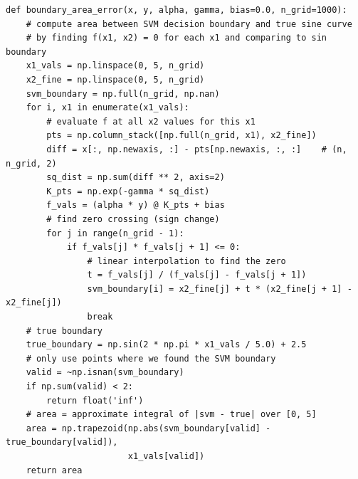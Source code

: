 \documentclass[11pt]{article}
\theoremstyle{mystyle}
\begin{document}
\begin{verbatim}
def boundary_area_error(x, y, alpha, gamma, bias=0.0, n_grid=1000):
    # compute area between SVM decision boundary and true sine curve
    # by finding f(x1, x2) = 0 for each x1 and comparing to sin boundary
    x1_vals = np.linspace(0, 5, n_grid)
    x2_fine = np.linspace(0, 5, n_grid)
    svm_boundary = np.full(n_grid, np.nan)
    for i, x1 in enumerate(x1_vals):
        # evaluate f at all x2 values for this x1
        pts = np.column_stack([np.full(n_grid, x1), x2_fine])
        diff = x[:, np.newaxis, :] - pts[np.newaxis, :, :]    # (n, n_grid, 2)
        sq_dist = np.sum(diff ** 2, axis=2)
        K_pts = np.exp(-gamma * sq_dist)
        f_vals = (alpha * y) @ K_pts + bias
        # find zero crossing (sign change)
        for j in range(n_grid - 1):
            if f_vals[j] * f_vals[j + 1] <= 0:
                # linear interpolation to find the zero
                t = f_vals[j] / (f_vals[j] - f_vals[j + 1])
                svm_boundary[i] = x2_fine[j] + t * (x2_fine[j + 1] - x2_fine[j])
                break
    # true boundary
    true_boundary = np.sin(2 * np.pi * x1_vals / 5.0) + 2.5
    # only use points where we found the SVM boundary
    valid = ~np.isnan(svm_boundary)
    if np.sum(valid) < 2:
        return float('inf')
    # area = approximate integral of |svm - true| over [0, 5]
    area = np.trapezoid(np.abs(svm_boundary[valid] - true_boundary[valid]),
                        x1_vals[valid])
    return area


\end{verbatim}
\end{document}
